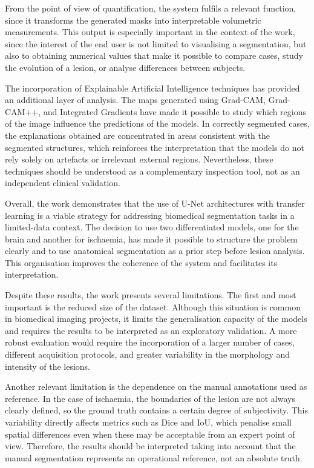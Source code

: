 From the point of view of quantification, the system fulfils a relevant function, since it transforms the generated masks into interpretable volumetric measurements.
This output is especially important in the context of the work, since the interest of the end user is not limited to visualising a segmentation, but also to 
obtaining numerical values that make it possible to compare cases, study the evolution of a lesion, or analyse differences between subjects.

The incorporation of Explainable Artificial Intelligence techniques has provided an additional layer of analysis. The maps generated using Grad-CAM, Grad-CAM++, and 
Integrated Gradients have made it possible to study which regions of the image influence the predictions of the models. In correctly segmented cases, the explanations 
obtained are concentrated in areas consistent with the segmented structures, which reinforces the interpretation that the models do not rely solely on artefacts or irrelevant 
external regions. Nevertheless, these techniques should be understood as a complementary inspection tool, not as an independent clinical validation.

Overall, the work demonstrates that the use of U-Net architectures with transfer learning is a viable strategy for addressing biomedical segmentation tasks 
in a limited-data context. The decision to use two differentiated models, one for the brain and another for ischaemia, has made it possible to structure the problem clearly 
and to use anatomical segmentation as a prior step before lesion analysis. This organisation improves the coherence of the system and facilitates its interpretation.

Despite these results, the work presents several limitations. The first and most important is the reduced size of the dataset. Although this situation is common 
in biomedical imaging projects, it limits the generalisation capacity of the models and requires the results to be interpreted as an exploratory validation. A more 
robust evaluation would require the incorporation of a larger number of cases, different acquisition protocols, and greater variability in the morphology and intensity of the lesions.

Another relevant limitation is the dependence on the manual annotations used as reference. In the case of ischaemia, the boundaries of the lesion are not always 
clearly defined, so the ground truth contains a certain degree of subjectivity. This variability directly affects metrics such as Dice and IoU, which penalise 
small spatial differences even when these may be acceptable from an expert point of view. Therefore, the results should be interpreted taking into account that the 
manual segmentation represents an operational reference, not an absolute truth.


